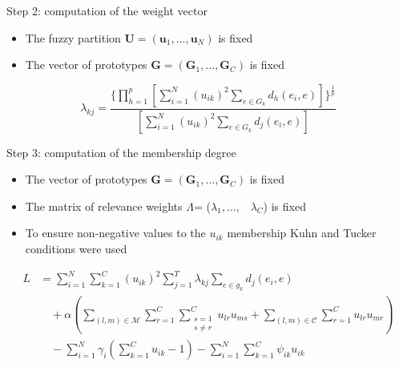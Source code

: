 \documentclass{beamer}
\begin{document}
\begin{frame}{Step 2: computation of the weight vector}
	\begin{itemize}
		\item{The fuzzy partition $\textbf{U}=(\textbf{u}_1,\ldots,\textbf{u}_N)$ is fixed}
		\item{The vector of prototypes $\textbf{G} = (\textbf{G}_{1},\ldots,\textbf{G}_{C})$ is fixed}
	\end{itemize}
	\begin{equation*}
		\lambda_{kj} = \frac{\{\prod_{h=1}^{p}[\sum_{i=1}^{N}(u_{ik})^{2}\sum_{e \in G_{k}}d_{h}(e_{i},e)]\}^{\frac{1}{p}}}{[\sum_{i=1}^{N}(u_{ik})^{2}\sum_{e \in G_{k}}d_{j}(e_{i},e)]}
	\end{equation*}
\end{frame}

\begin{frame}{Step 3: computation of the membership degree}
	\begin{itemize}
		\item{The vector of prototypes $\textbf{G} = (\textbf{G}_{1},\ldots,\textbf{G}_{C})$ is fixed}
		\item{The matrix of relevance weights \boldmath$\Lambda$\unboldmath = (\boldmath$\lambda$\unboldmath$_1,\ldots,$ \, \boldmath$\lambda$\unboldmath$_C$) is fixed}
		\item{To ensure non-negative values to the $u_{ik}$ membership Kuhn and Tucker conditions were used}
	\end{itemize}
\begin{equation*}
\begin{split}
L&
=
\sum_{i=1}^{N}
\sum_{k=1}^{C}(u_{ik})^{2}
\sum_{j=1}^{T}\lambda_{kj}
\sum_{{e}\in{g_{k}}}d_{j}(e_{i},e) \\
& \quad +
\alpha
\left (
\sum_{(l,m)\in\mathcal{M}}
\sum_{r=1}^{C}
\sum_{
\substack{
s=1 \\ {s}\neq{r}
}
}^{C}u_{lr}u_{ms}
+
\sum_{(l,m)\in\mathcal{C}}
\sum_{r=1}^{C}u_{lr}u_{mr}
\right ) \\
& \quad -
\sum_{i=1}^{N}\gamma_{i}
\left (
\sum_{k=1}^{C}u_{ik}-1
\right )
-
\sum_{i=1}^{N}
\sum_{k=1}^{C}\psi_{ik}u_{ik}
\end{split}
\end{equation*}
\end{frame}
\end{document}
